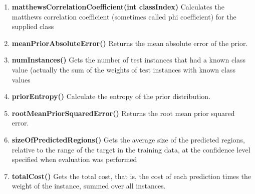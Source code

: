 \documentclass[a4paper,12pt, english]{article}
\begin{document}
\begin{enumerate}
          
          



          
\item \textbf{matthewsCorrelationCoefficient(int classIndex)}
          Calculates the matthews correlation coefficient (sometimes called phi coefficient) for the supplied class
          

          
\item \textbf{meanPriorAbsoluteError()}
          Returns the mean absolute error of the prior.
          


\item \textbf{numInstances()}
          Gets the number of test instances that had a known class value (actually the sum of the weights of test instances with known class values

      
      



\item \textbf{priorEntropy()}
          Calculate the entropy of the prior distribution.    
                    
\item \textbf{rootMeanPriorSquaredError()}
          Returns the root mean prior squared error.          
          
          
             
\item \textbf{sizeOfPredictedRegions()}
          Gets the average size of the predicted regions, relative to the range of the target in the training data, at the confidence level specified when evaluation was performed

\item \textbf{totalCost()}
          Gets the total cost, that is, the cost of each prediction times the weight of the instance, summed over all instances.                   


\end{enumerate}
\end{document}
